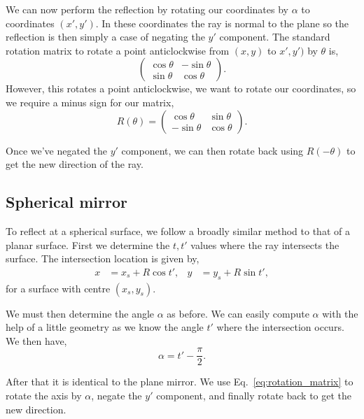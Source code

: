 \documentclass{article}
\begin{document}
We can now perform the reflection by rotating our coordinates by $\alpha$ to coordinates $(x', y')$. In these coordinates the ray is normal to the plane so the reflection is then simply a case of negating the $y'$ component. The standard rotation matrix to rotate a point anticlockwise from $(x, y)$ to $x', y')$ by $\theta$ is,
\begin{equation}
    \begin{pmatrix}
        \cos \theta & -\sin \theta \\
        \sin \theta &  \cos \theta
    \end{pmatrix}.
\end{equation}
However, this rotates a point anticlockwise, we want to rotate our coordinates, so we require a minus sign for our matrix,
\begin{equation}
    \label{eq:rotation_matrix}
    R(\theta)
    =
    \begin{pmatrix}
         \cos \theta & \sin \theta \\
        -\sin \theta & \cos \theta
    \end{pmatrix}.
\end{equation}

Once we've negated the $y'$ component, we can then rotate back using $R(-\theta)$ to get the new direction of the ray.

\subsection{Spherical mirror}
To reflect at a spherical surface, we follow a broadly similar method to that of a planar surface. First we determine the $t, t'$ values where the ray intersects the surface. The intersection location is given by,
\begin{align}
    x
    &=
    x_s + R \cos t',
    &
    y
    &=
    y_s + R \sin t',
\end{align}
for a surface with centre $(x_s, y_s)$.

We must then determine the angle $\alpha$ as before. We can easily compute $\alpha$ with the help of a little geometry as we know the angle $t'$ where the intersection occurs. We then have,
\begin{equation}
    \label{eq:alpha_sph}
    \alpha = t' - \frac{\pi}{2}.
\end{equation}

After that it is identical to the plane mirror. We use Eq.~\ref{eq:rotation_matrix} to rotate the axis by $\alpha$, negate the $y'$ component, and finally rotate back to get the new direction.
\end{document}
